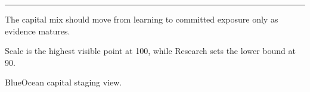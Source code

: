 \documentclass[10pt,a4paper]{article}
\begin{document}
\vspace{3pt}\noindent\begin{minipage}[t]{0.58\linewidth}
\textcolor{BOGreen}{\rule{24mm}{0.6pt}}\par\vspace{3pt}
{\footnotesize\color{BOText} The capital mix should move from learning to committed exposure only as evidence matures.}\par\vspace{2pt}
{\footnotesize\color{BOText} Scale is the highest visible point at 100, while Research sets the lower bound at 90.}\par\vspace{2pt}
\end{minipage}\hfill\begin{minipage}[t]{0.36\linewidth}
\par
\end{minipage}\par\vspace{2pt}
\par
{\scriptsize\color{BOMuted} BlueOcean capital staging view.}\par
\end{document}
